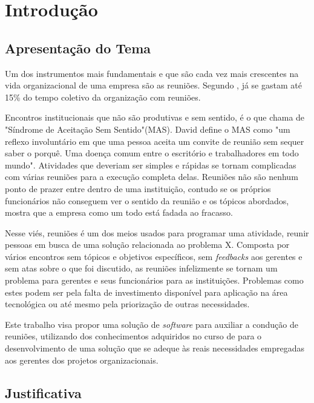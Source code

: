 \chapter[Introdução]{Introdução}
\label{cp:introducao}

\section{Apresentação do Tema}
\label{sec:apresentacao}

Um dos instrumentos mais fundamentais e que são cada vez mais crescentes na vida organizacional de uma empresa são as reuniões. Segundo \cite{allen2016}, já se gastam até 15\% do tempo coletivo da organização com reuniões.

Encontros institucionais que não são produtivas e sem sentido, é o que \cite{davidgrady} chama de "Síndrome de Aceitação Sem Sentido"(MAS). David define o MAS como "um reflexo involuntário em que uma pessoa aceita um convite de reunião sem sequer saber o porquê. Uma doença comum entre o escritório e trabalhadores em todo mundo". Atividades que deveriam ser simples e rápidas se tornam complicadas com várias reuniões para a execução completa delas. Reuniões não são nenhum ponto de prazer entre dentro de uma instituição, contudo se os próprios funcionários não conseguem ver o sentido da reunião e os tópicos abordados, mostra que a empresa como um todo está fadada ao fracasso.

Nesse viés, reuniões é um dos meios usados para programar uma atividade, reunir pessoas em busca de uma solução relacionada ao problema X. Composta por vários encontros sem tópicos e objetivos específicos, sem \textit{feedbacks} aos gerentes e sem atas sobre o que foi discutido, as reuniões infelizmente se tornam um problema para gerentes e seus funcionários para as instituições. Problemas como estes podem ser pela falta de investimento disponível para aplicação na área tecnológica ou até mesmo pela priorização de outras necessidades.

Este trabalho visa propor uma solução de \textit{software} para auxiliar a condução de reuniões, utilizando dos conhecimentos adquiridos no curso de \imprimircurso para o desenvolvimento de uma solução que se adeque às reais necessidades empregadas aos gerentes dos projetos organizacionais.

\section{Justificativa}
\label{sec:justificativa}

